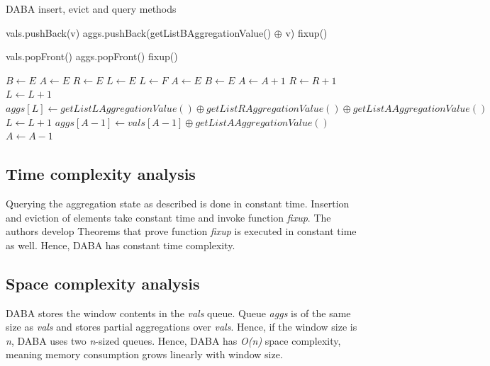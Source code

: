 \begin{algorithm}
    \caption[De-Amortized Banker’s Aggregator (DABA)]{DABA insert, evict and query methods}
    \label{pseudo:daba}
    \begin{algorithmic}[1]
            \State {}
        \EndFunction
        
            \State vals.pushBack(v)
            \State aggs.pushBack(getListBAggregationValue() $\oplus$ v)
            \State fixup()
        \EndFunction
        
            \State vals.popFront()
            \State aggs.popFront()
            \State fixup()
        \EndFunction
        
            \State $B \gets E$
            \State $A \gets E$
            \State $R \gets E$
            \State $L \gets E$
        \Else
                \State $L \gets F$
                \State $A \gets E$
                \State $B \gets E$
            \EndIf
                \State $A \gets A + 1$
                \State $R \gets R + 1$
                \State $L \gets L + 1$
            \Else
                \State $aggs[L] \gets getListLAggregationValue() \oplus getListRAggregationValue() \oplus getListAAggregationValue()$
                \State $L \gets L + 1$
                \State $aggs[A - 1] \gets vals[A - 1] \oplus getListAAggregationValue()$
                \State $A \gets A - 1$
            \EndIf
        \EndIf
        \EndFunction
    \end{algorithmic}
\end{algorithm}


\subsection*{Time complexity analysis}
Querying the aggregation state as described is done in constant time. Insertion and eviction of elements take constant time and invoke function \textit{fixup}. The authors develop Theorems that prove function \textit{fixup} is executed in constant time as well. Hence, DABA has constant time complexity.

\subsection*{Space complexity analysis}
DABA stores the window contents in the \textit{vals} queue. Queue \textit{aggs} is of the same size as \textit{vals} and stores partial aggregations over \textit{vals}. Hence, if the window size is \textit{n}, DABA uses two \textit{n}-sized queues. Hence, DABA has \textit{O(n)} space complexity, meaning memory consumption grows linearly with window size.

